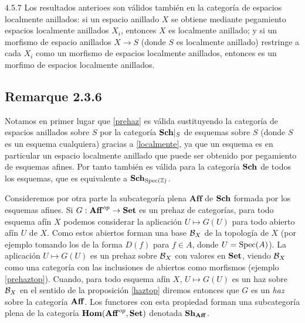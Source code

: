 \documentclass[twoside]{article}
\begin{document}
\begin{remarque}{4.5.7}\label{localmente}
Los resultados anterioes son válidos también en la categoría de espacios localmente anillados: si un espacio anillado $X$ se obtiene mediante pegamiento espacios localmente anillados $X_i$, entonces $X$ es localmente anillado; y si un morfismo de espacio anillados $X\to S$ (donde $S$ es localmente anillado) restringe a cada $X_i$ como un morfismo de espacios localmente anillados, entonces es un morfimo de espacios localmente anillados. 
\end{remarque}



\subsection{Remarque 2.3.6}

Notamos en primer lugar que \ref{prehaz} es válida sustituyendo la categoría de espacios anillados sobre $S$ por la categoría $\mathrm{\mathbf{Sch}}|_{S}$ de esquemas sobre $S$ (donde $S$ es un esquema cualquiera) gracias a \ref{localmente}, ya que un esquema es en particular un espacio localmente anillado que puede ser obtenido por pegamiento de esquemas afines. Por tanto también es válida para la categoría $\mathrm{\mathbf{Sch}}$ de todos los esquemas, que es equivalente a $\mathrm{\mathbf{Sch}}_{\operatorname{Spec}(\mathbb{Z})}$. %

Consideremos por otra parte la subcategoría plena $\mathrm{\mathbf{Aff}}$ de $\mathrm{\mathbf{Sch}}$ formada por los esquemas afines. Si $G:\mathrm{\mathbf{Aff}}^{op}\to\mathrm{\mathbf{Set}}$ es un prehaz de categorías, para todo esquema afín $X$ podemos considerar la aplicación $U\mapsto G(U)$ para todo abierto afín $U$ de $X$. Como estos abiertos forman una base ${\mathcal B}_X$ de la topología de $X$ (por ejemplo tomando los de la forma $D(f)$ para $f\in A$, donde $U=\operatorname{Spec}(A)$). La aplicación $U\mapsto G(U)$ es un prehaz sobre ${\mathcal B}_X$ con valores en $\mathrm{\mathbf{Set}}$, viendo ${\mathcal B}_X$ como una categoría con las inclusiones de abiertos como morfismos (ejemplo \ref{prehaztop}). Cuando, para todo esquema afín $X$, $U\mapsto G(U)$ es un haz sobre ${\mathcal B}_X$ en el sentido de la proposición \ref{haztop} diremos entonces que $G$ es un \emph{haz} sobre la categoría $\mathrm{\mathbf{Aff}}$. Los functores con esta propiedad forman una subcategoría plena de la categoría $\mathrm{\mathbf{Hom}}(\mathrm{\mathbf{Aff}}^{op},\mathrm{\mathbf{Set}})$ denotada $\mathrm{\mathbf{Sh}}_{\mathrm{\mathbf{Aff}}}$. 
\end{document}

